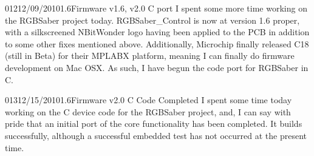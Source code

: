 \documentclass[12pt,letterpaper,onecolumn]{article}
\begin{document}
\begin{nbentry}{012}{12/09/2010}{1.6}{Firmware v1.6, v2.0 C port}
\indent I spent some more time working on the RGBSaber project today. RGBSaber\_Control is now at version 1.6 proper, with a silkscreened NBitWonder logo having been applied to the PCB in addition to some other fixes mentioned above. Additionally, Microchip finally released C18 (still in Beta) for their MPLABX platform, meaning I can finally do firmware development on Mac OSX. As such, I have begun the code port for RGBSaber in C.
\end{nbentry}

\begin{nbentry}{013}{12/15/2010}{1.6}{Firmware v2.0 C Code Completed}
\indent I spent some time today working on the C device code for the RGBSaber project, and, I can say with pride that an initial port of the core functionality has been completed. It builds successfully, although a successful embedded test has not occurred at the present time.
\end{nbentry}
\end{document}
